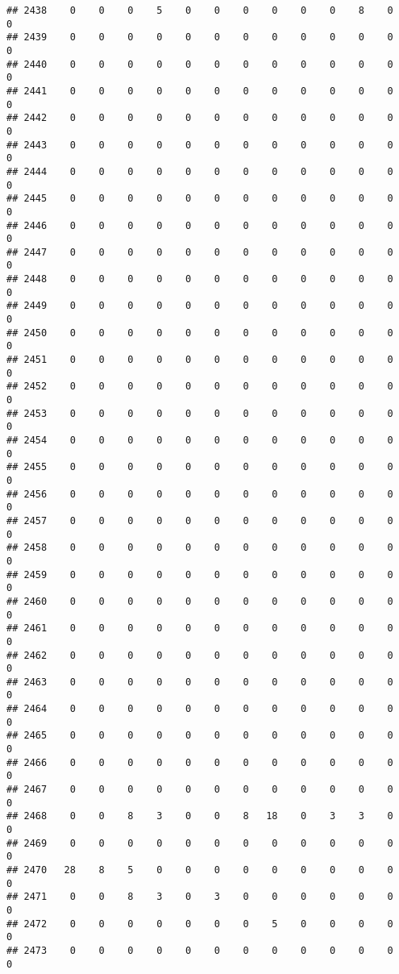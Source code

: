 \documentclass[]{article}
\begin{document}
\begin{verbatim}
## 2438    0    0    0    5    0    0    0    0    0    0    8    0    0
## 2439    0    0    0    0    0    0    0    0    0    0    0    0    0
## 2440    0    0    0    0    0    0    0    0    0    0    0    0    0
## 2441    0    0    0    0    0    0    0    0    0    0    0    0    0
## 2442    0    0    0    0    0    0    0    0    0    0    0    0    0
## 2443    0    0    0    0    0    0    0    0    0    0    0    0    0
## 2444    0    0    0    0    0    0    0    0    0    0    0    0    0
## 2445    0    0    0    0    0    0    0    0    0    0    0    0    0
## 2446    0    0    0    0    0    0    0    0    0    0    0    0    0
## 2447    0    0    0    0    0    0    0    0    0    0    0    0    0
## 2448    0    0    0    0    0    0    0    0    0    0    0    0    0
## 2449    0    0    0    0    0    0    0    0    0    0    0    0    0
## 2450    0    0    0    0    0    0    0    0    0    0    0    0    0
## 2451    0    0    0    0    0    0    0    0    0    0    0    0    0
## 2452    0    0    0    0    0    0    0    0    0    0    0    0    0
## 2453    0    0    0    0    0    0    0    0    0    0    0    0    0
## 2454    0    0    0    0    0    0    0    0    0    0    0    0    0
## 2455    0    0    0    0    0    0    0    0    0    0    0    0    0
## 2456    0    0    0    0    0    0    0    0    0    0    0    0    0
## 2457    0    0    0    0    0    0    0    0    0    0    0    0    0
## 2458    0    0    0    0    0    0    0    0    0    0    0    0    0
## 2459    0    0    0    0    0    0    0    0    0    0    0    0    0
## 2460    0    0    0    0    0    0    0    0    0    0    0    0    0
## 2461    0    0    0    0    0    0    0    0    0    0    0    0    0
## 2462    0    0    0    0    0    0    0    0    0    0    0    0    0
## 2463    0    0    0    0    0    0    0    0    0    0    0    0    0
## 2464    0    0    0    0    0    0    0    0    0    0    0    0    0
## 2465    0    0    0    0    0    0    0    0    0    0    0    0    0
## 2466    0    0    0    0    0    0    0    0    0    0    0    0    0
## 2467    0    0    0    0    0    0    0    0    0    0    0    0    0
## 2468    0    0    8    3    0    0    8   18    0    3    3    0    0
## 2469    0    0    0    0    0    0    0    0    0    0    0    0    0
## 2470   28    8    5    0    0    0    0    0    0    0    0    0    0
## 2471    0    0    8    3    0    3    0    0    0    0    0    0    0
## 2472    0    0    0    0    0    0    0    5    0    0    0    0    0
## 2473    0    0    0    0    0    0    0    0    0    0    0    0    0

\end{verbatim}
\end{document}
